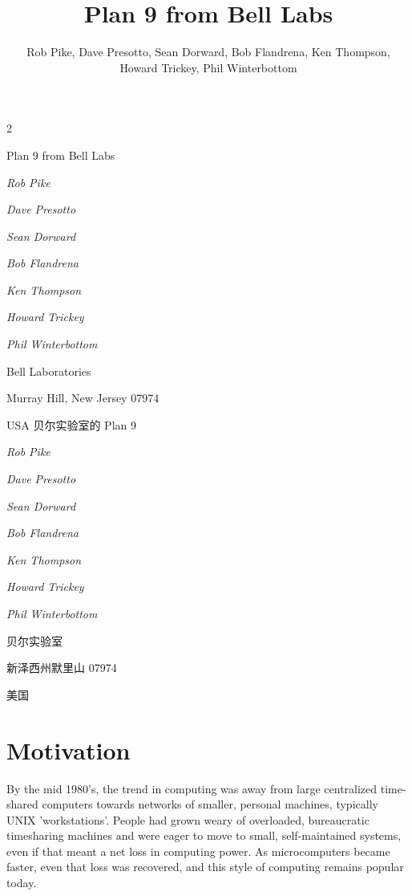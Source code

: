 \documentclass{article}
\title{Plan 9 from Bell Labs}
\author{Rob Pike, Dave Presotto, Sean Dorward, Bob Flandrena, Ken Thompson, Howard Trickey, Phil Winterbottom}
\begin{document}
\maketitle

\begin{paracol}{2}

Plan 9 from Bell Labs

\textit{Rob Pike}

\textit{Dave Presotto}

\textit{Sean Dorward}

\textit{Bob Flandrena}

\textit{Ken Thompson}

\textit{Howard Trickey}

\textit{Phil Winterbottom}

Bell Laboratories

Murray Hill, New Jersey 07974

USA
\switchcolumn
贝尔实验室的 Plan 9

\textit{Rob Pike}

\textit{Dave Presotto}

\textit{Sean Dorward}

\textit{Bob Flandrena}

\textit{Ken Thompson}

\textit{Howard Trickey}

\textit{Phil Winterbottom}

贝尔实验室

新泽西州默里山 07974

美国
\switchcolumn*
\section*{Motivation}
By the mid 1980's, the trend in computing was away from large centralized time-shared computers towards networks of smaller, personal machines, typically UNIX 'workstations'. People had grown weary of overloaded, bureaucratic timesharing machines and were eager to move to small, self-maintained systems, even if that meant a net loss in computing power. As microcomputers became faster, even that loss was recovered, and this style of computing remains popular today.
\switchcolumn

\end{paracol}
\end{document}
